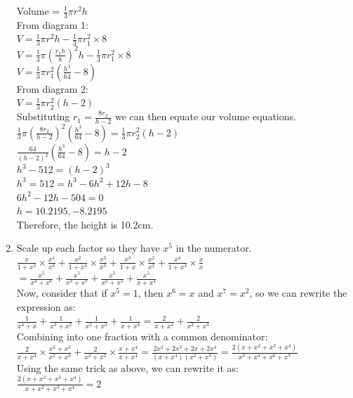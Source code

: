 \documentclass[../main.tex]{subfiles}
\begin{document}
\begin{enumerate}
    Volume = \(\frac{1}{3}\pi r^2 h\)\\

    From diagram 1:\\
    \(V=\frac{1}{3}\pi r^2 h-\frac{1}{3}\pi r_1^2 \times 8\)\\

    \(V=\frac{1}{3}\pi (\frac{r_1 h}{8})^2 h-\frac{1}{3}\pi r_1^2 \times 8\)\\

    \(V=\frac{1}{3}\pi r_1^2(\frac{h^3}{64}-8)\)\\

    From diagram 2:\\
    \(V=\frac{1}{3}\pi r_2^2 (h-2)\)\\

    Substituting \(r_1 =\frac{8r_2}{h-2} \) we can then equate our volume equations.\\
    \(\frac{1}{3}\pi (\frac{8r_2}{h-2})^2(\frac{h^3}{64}-8)=\frac{1}{3}\pi r_2^2 (h-2)\)\\

    \(\frac{64}{(h-2)^2}(\frac{h^3}{64}-8)=h-2\)\\

    \(h^3-512=(h-2)^3\)\\

    \(h^3=512=h^3-6h^2+12h-8\)\\

    \(6h^2-12h-504=0\)\\

    \(h=10.2195, -8.2195\)\\

    Therefore, the height is 10.2cm.\\

    \item 
    Scale up each factor so they have \(x^5\) in the numerator.\\

    \(\frac{x}{1+x^2}\times \frac{x^4}{x^4}+\frac{x^2}{1+x^4}\times \frac{x^3}{x^3}+\frac{x^3}{1+x}\times \frac{x^2}{x^2}+\frac{x^4}{1+x^3}\times \frac{x}{x}\)\\

    \(=\frac{x^5}{x^4+x^6}+\frac{x^5}{x^3+x^7}+\frac{x^5}{x^2+x^3}+\frac{x^5}{x+x^4}\)\\

    Now, consider that if \(x^5=1\), then \(x^6=x\) and \(x^7=x^2\), so we can rewrite the expression as:\\

    \(\frac{1}{x^4+x}+\frac{1}{x^3+x^2}+\frac{1}{x^2+x^3}+\frac{1}{x+x^4}=\frac{2}{x+x^4}+\frac{2}{x^2+x^3}\)\\

    Combining into one fraction with a common denominator:\\
    \(\frac{2}{x+x^4} \times \frac{x^2+x^3}{x^2+x^3}+\frac{2}{x^2+x^3}\times \frac{x+x^4}{x+x^4}=\frac{2x^2+2x^3+2x+2x^4}{(x+x^4)(x^2+x^3)}=\frac{2(x+x^2+x^3+x^4)}{x^3+x^4+x^6+x^7}\)\\

    Using the same trick as above, we can rewrite it as:\\
    \(\frac{2(x+x^2+x^3+x^4)}{x+x^2+x^3+x^4}=2\)
    \end{enumerate}
\end{document}
